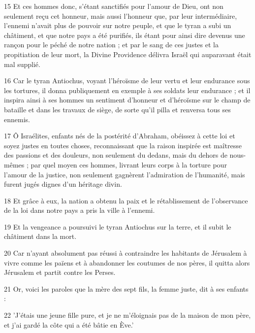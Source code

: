 \par 15 Et ces hommes donc, s'étant sanctifiés pour l'amour de Dieu, ont non seulement reçu cet honneur, mais aussi l'honneur que, par leur intermédiaire, l'ennemi n'avait plus de pouvoir sur notre peuple, et que le tyran a subi un châtiment, et que notre pays a été purifiés, ils étant pour ainsi dire devenus une rançon pour le péché de notre nation ; et par le sang de ces justes et la propitiation de leur mort, la Divine Providence délivra Israël qui auparavant était mal supplié.

\par 16 Car le tyran Antiochus, voyant l'héroïsme de leur vertu et leur endurance sous les tortures, il donna publiquement en exemple à ses soldats leur endurance ; et il inspira ainsi à ses hommes un sentiment d'honneur et d'héroïsme sur le champ de bataille et dans les travaux de siège, de sorte qu'il pilla et renversa tous ses ennemis.

\par 17 Ô Israélites, enfants nés de la postérité d'Abraham, obéissez à cette loi et soyez justes en toutes choses, reconnaissant que la raison inspirée est maîtresse des passions et des douleurs, non seulement du dedans, mais du dehors de nous-mêmes ; par quel moyen ces hommes, livrant leurs corps à la torture pour l'amour de la justice, non seulement gagnèrent l'admiration de l'humanité, mais furent jugés dignes d'un héritage divin.

\par 18 Et grâce à eux, la nation a obtenu la paix et le rétablissement de l'observance de la loi dans notre pays a pris la ville à l'ennemi.

\par 19 Et la vengeance a poursuivi le tyran Antiochus sur la terre, et il subit le châtiment dans la mort.

\par 20 Car n'ayant absolument pas réussi à contraindre les habitants de Jérusalem à vivre comme les païens et à abandonner les coutumes de nos pères, il quitta alors Jérusalem et partit contre les Perses.

\par 21 Or, voici les paroles que la mère des sept fils, la femme juste, dit à ses enfants :

\par 22 'J'étais une jeune fille pure, et je ne m'éloignais pas de la maison de mon père, et j'ai gardé la côte qui a été bâtie en Ève.'

